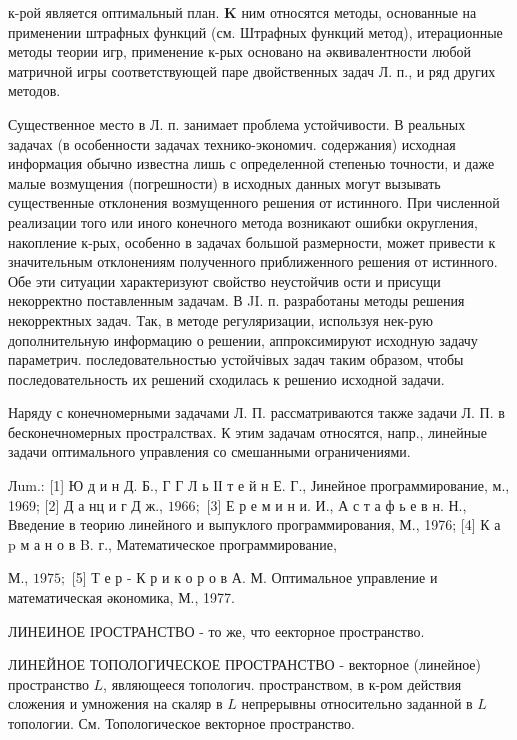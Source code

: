 \documentclass[10pt]{article}
\begin{document}
к-рой является оптимальный план. $\mathbf{K}$ ним относятся методы, основанные на применении штрафных функций (см. Штрафных функций метод), итерационные методы теории игр, применение к-рых основано на әквивалентности любой матричной игры соответствующей паре двойственных задач Л. п., и ряд других методов.



Существенное место в Л. п. занимает проблема устойчивости. В реальных задачах (в особенности задачах технико-экономич. содержания) исходная информация обычно известна лишь с определенной степенью точности, и даже малые возмущения (погрешности) в исходных данных могут вызывать существенные отклонения возмущенного решения от истинного. При численной реализации того или иного конечного метода возникают ошибки округления, накопление к-рых, особенно в задачах большой размерности, может привести к значительным отклонениям полученного приближенного решения от истинного. Обе эти ситуации характеризуют свойство неустойчив ости и присущи некорректно поставленным задачам. В JI. п. разработаны методы решения некорректных задач. Так, в методе регуляризации, используя нек-рую дополнительную информацию о решении, аппроксимируют исходную задачу параметрич. последовательностью устойчівых задач таким образом, чтобы последовательность их решений сходилась к решенио исходной задачи.



Наряду с конечномерными задачами Л. П. рассматриваются также задачи Л. П. в бесконечномерных простралствах. К этим задачам относятся, напр., линейные задачи оптимального управления со смешанными ограничениями.



Лum.: [1] Ю д и н Д. Б., Г Г Л ь ІІ т е й н Е. Г., Јинейное программирование, м., 1969; [2] Д а нц и г Д ж., $1966 ;$ [3] Е р е м и н и. И., А с т а ф ь е в н. Н., Введение в теорию линейного и выпуклого программирования, М., 1976; [4] К а p м а н о в B. г., Математическое программирование,

М., $1975 ;$ [5] Т е р - К р и к о р о в А. М. Оптимальное управление и математическая әкономика, М., 1977.



ЛИНЕИНОЕ IРОСТРАНСТВО - то же, что еекторное пространство.



ЛИНЕЙНОЕ ТОПОЛОГИЧЕСКОЕ ПРОСТРАНСТВО - векторное (линейное) пространство $L$, являющееся топологич. пространством, в к-ром действия сложения и умножения на скаляр в $L$ непрерывны относительно заданной в $L$ топологии. См. Топологическое векторное пространство.
\end{document}
